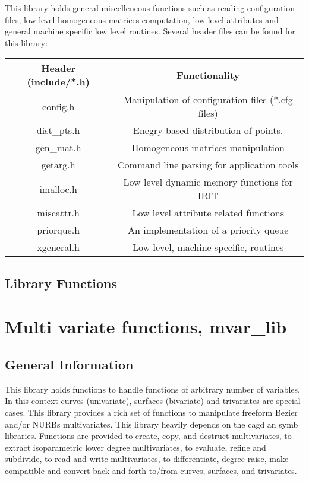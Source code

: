 {This library holds general miscelleneous functions such as reading
configuration files, low level homogeneous matrices computation, low
level attributes and general machine specific low level routines.
Several header files can be found for this library:
\begin{center}
\begin{tabular}{||c|c||} \hline
    Header (include/*.h) & Functionality \\ \hline
    config.h   & Manipulation of configuration files (*.cfg files) \\
    dist\_pts.h & Enegry based distribution of points. \\
    gen\_mat.h  & Homogeneous matrices manipulation \\
    getarg.h   & Command line parsing for application tools \\
    imalloc.h  & Low level dynamic memory functions for IRIT \\
    miscattr.h & Low level attribute related functions \\
    priorque.h & An implementation of a priority queue \\
    xgeneral.h & Low level, machine specific, routines \\ \hline
\end{tabular}
\end{center}

\section{Library Functions}


\chapter{Multi variate functions, mvar\_lib}

\section{General Information}

This library holds functions to handle functions of arbitrary number
of variables. In this context curves (univariate), surfaces
(bivariate) and trivariates are special cases. This library provides a
rich set of functions to manipulate freeform Bezier and/or NURBs
multivariates. This library heavily depends on the cagd an symb
libraries. Functions are provided to create, copy, and destruct
multivariates, to extract isoparametric lower degree multivariates, to
evaluate, refine and subdivide, to read and write multivariates, to
differentiate, degree raise, make compatible and convert back and
forth to/from curves, surfaces, and trivariates.

}

